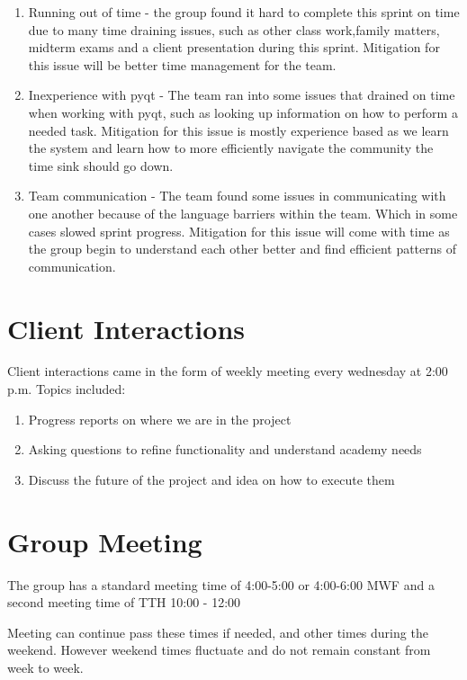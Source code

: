 \documentclass[11pt]{book}
\begin{document}
\begin{enumerate}
\item Running out of time - the group found it hard to complete this sprint on time due to many time draining issues, such as other class work,family matters, midterm exams and a client presentation during this sprint. Mitigation for this issue will be better time management for the team.
\item Inexperience with pyqt - The team ran into some issues that drained on time when working with pyqt, such as looking up information on how to perform a needed task. Mitigation for this issue is mostly experience based as we learn the system and learn how to more efficiently navigate the community the time sink should go down.
\item Team communication - The team found some issues in communicating with one another because of the language barriers within the team. Which in some cases slowed sprint progress. Mitigation for this issue will come with time as the group begin to understand each other better and find efficient patterns of communication.
\end{enumerate}

\section{Client Interactions}

Client interactions came in the form of weekly meeting every wednesday at 2:00 p.m. Topics included:

\begin{enumerate}
\item Progress reports on where we are in the project
\item Asking questions to refine functionality and understand academy needs
\item Discuss the future of the project and idea on how to execute them
\end{enumerate}


\section{Group Meeting}

The group has a standard meeting time of 4:00-5:00 or 4:00-6:00 MWF and a second meeting time of TTH 10:00 - 12:00

Meeting can continue pass these times if needed, and other times during the weekend. However weekend times fluctuate and do not remain constant from week to week. 
\end{document}
